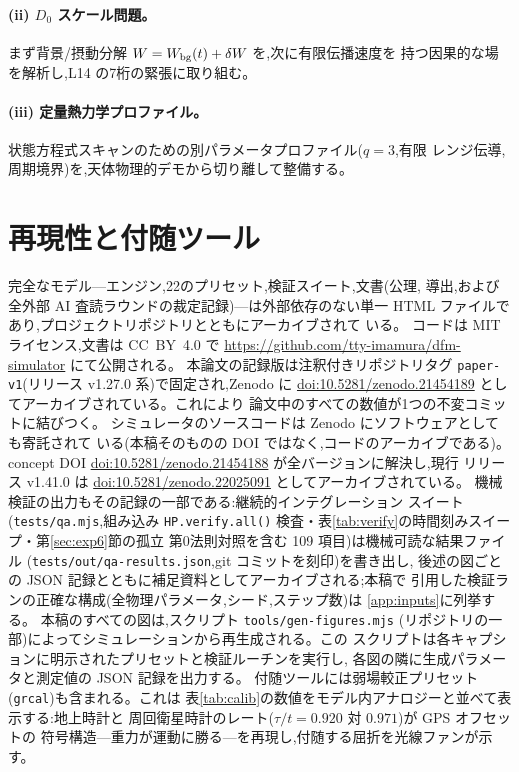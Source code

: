 \documentclass[a4paper,10pt,twocolumn]{ltjsarticle}
\newcommand{\Dz}{D_0}
\begin{document}
\paragraph*{(ii) $\Dz$ スケール問題。}
まず背景/摂動分解 $W = W_{\rm bg}(t) + \delta W$ を,次に有限伝播速度を
持つ因果的な場を解析し,L14 の7桁の緊張に取り組む。

\paragraph*{(iii) 定量熱力学プロファイル。}
状態方程式スキャンのための別パラメータプロファイル($q = 3$,有限
レンジ伝導,周期境界)を,天体物理的デモから切り離して整備する。

\section*{再現性と付随ツール}
\label{sec:repro}

完全なモデル---エンジン,22のプリセット,検証スイート,文書(公理,
導出,および全外部 AI 査読ラウンドの裁定記録)---は外部依存のない単一
HTML ファイルであり,プロジェクトリポジトリとともにアーカイブされて
いる。
コードは MIT ライセンス,文書は CC~BY~4.0 で
\url{https://github.com/tty-imamura/dfm-simulator} にて公開される。
本論文の記録版は注釈付きリポジトリタグ \texttt{paper-v1}(リリース
v1.27.0 系)で固定され,Zenodo に
\href{https://doi.org/10.5281/zenodo.21454189}%
{doi:10.5281/zenodo.21454189} としてアーカイブされている。これにより
論文中のすべての数値が1つの不変コミットに結びつく。
シミュレータのソースコードは Zenodo にソフトウェアとしても寄託されて
いる(本稿そのものの DOI ではなく,コードのアーカイブである)。
concept DOI \href{https://doi.org/10.5281/zenodo.21454188}%
{\mbox{doi:10.5281/zenodo.21454188}} が全バージョンに解決し,現行
リリース v1.41.0 は \href{https://doi.org/10.5281/zenodo.22025091}%
{\mbox{doi:10.5281/zenodo.22025091}} としてアーカイブされている。
機械検証の出力もその記録の一部である:継続的インテグレーション
スイート(\texttt{tests/qa.mjs},組み込み \texttt{HP.verify.all()}
検査・表\ref{tab:verify}の時間刻みスイープ・第\ref{sec:exp6}節の孤立
第0法則対照を含む 109 項目)は機械可読な結果ファイル
(\texttt{tests/out/qa-results.json},git コミットを刻印)を書き出し,
後述の図ごとの JSON 記録とともに補足資料としてアーカイブされる;本稿で
引用した検証ランの正確な構成(全物理パラメータ,シード,ステップ数)は
\ref{app:inputs}に列挙する。
本稿のすべての図は,スクリプト \texttt{tools/gen-figures.mjs}
(リポジトリの一部)によってシミュレーションから再生成される。この
スクリプトは各キャプションに明示されたプリセットと検証ルーチンを実行し,
各図の隣に生成パラメータと測定値の JSON 記録を出力する。
付随ツールには弱場較正プリセット(\texttt{grcal})も含まれる。これは
表\ref{tab:calib}の数値をモデル内アナロジーと並べて表示する:地上時計と
周回衛星時計のレート($\tau/t = 0.920$ 対 $0.971$)が GPS オフセットの
符号構造---重力が運動に勝る---を再現し,付随する屈折を光線ファンが示す。
\end{document}
